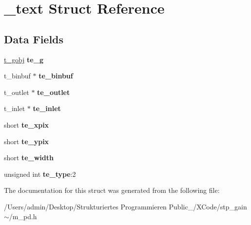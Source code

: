 \hypertarget{struct__text}{}\section{\+\_\+text Struct Reference}
\label{struct__text}
\subsection*{Data Fields}
\begin{DoxyCompactItemize}
\item 
\mbox{\label{struct__text_a2a1d03c47dc522ee54abf232b686d967}} 
\hyperlink{struct__gobj}{t\+\_\+gobj} {\bfseries te\+\_\+g}
\item 
\mbox{\label{struct__text_abd723d92731b3203626cd3659d803979}} 
t\+\_\+binbuf $\ast$ {\bfseries te\+\_\+binbuf}
\item 
\mbox{\label{struct__text_abd5fa9b012cb076294ca3a02619b0c08}} 
t\+\_\+outlet $\ast$ {\bfseries te\+\_\+outlet}
\item 
\mbox{\label{struct__text_a974a2ba622d24866ec9ff114cd8b6304}} 
t\+\_\+inlet $\ast$ {\bfseries te\+\_\+inlet}
\item 
\mbox{\label{struct__text_abfa7d8a29cf174c52ff21e300bbc6024}} 
short {\bfseries te\+\_\+xpix}
\item 
\mbox{\label{struct__text_a1b09541116146f438ed8967942e375e0}} 
short {\bfseries te\+\_\+ypix}
\item 
\mbox{\label{struct__text_a5b41ab2c4ac78a6337d9b3c9439c46ff}} 
short {\bfseries te\+\_\+width}
\item 
\mbox{\label{struct__text_af7108f5ddfff3bb67e5c350d29ceb9a5}} 
unsigned int {\bfseries te\+\_\+type}\+:2
\end{DoxyCompactItemize}


The documentation for this struct was generated from the following file\+:\begin{DoxyCompactItemize}
\item 
/\+Users/admin/\+Desktop/\+Strukturiertes Programmieren Public\+\_/\+X\+Code/stp\+\_\+gain$\sim$/m\+\_\+pd.\+h\end{DoxyCompactItemize}
